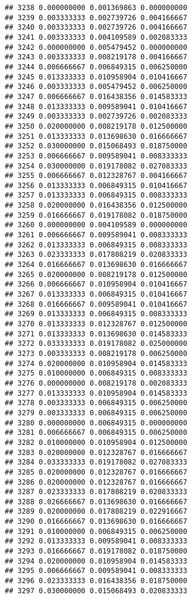 \documentclass[
]{article}
\begin{document}
\begin{verbatim}
## 3238 0.000000000 0.001369863 0.000000000
## 3239 0.003333333 0.002739726 0.004166667
## 3240 0.003333333 0.002739726 0.004166667
## 3241 0.003333333 0.004109589 0.002083333
## 3242 0.000000000 0.005479452 0.000000000
## 3243 0.003333333 0.008219178 0.004166667
## 3244 0.006666667 0.006849315 0.006250000
## 3245 0.013333333 0.010958904 0.010416667
## 3246 0.003333333 0.005479452 0.006250000
## 3247 0.006666667 0.016438356 0.014583333
## 3248 0.013333333 0.009589041 0.010416667
## 3249 0.003333333 0.002739726 0.002083333
## 3250 0.020000000 0.008219178 0.012500000
## 3251 0.013333333 0.013698630 0.016666667
## 3252 0.030000000 0.015068493 0.018750000
## 3253 0.006666667 0.009589041 0.008333333
## 3254 0.030000000 0.019178082 0.027083333
## 3255 0.006666667 0.012328767 0.004166667
## 3256 0.013333333 0.006849315 0.010416667
## 3257 0.013333333 0.006849315 0.008333333
## 3258 0.020000000 0.016438356 0.012500000
## 3259 0.016666667 0.019178082 0.018750000
## 3260 0.000000000 0.004109589 0.000000000
## 3261 0.006666667 0.009589041 0.008333333
## 3262 0.013333333 0.006849315 0.008333333
## 3263 0.023333333 0.017808219 0.020833333
## 3264 0.016666667 0.013698630 0.016666667
## 3265 0.020000000 0.008219178 0.012500000
## 3266 0.006666667 0.010958904 0.010416667
## 3267 0.013333333 0.006849315 0.010416667
## 3268 0.016666667 0.009589041 0.010416667
## 3269 0.013333333 0.006849315 0.008333333
## 3270 0.013333333 0.012328767 0.012500000
## 3271 0.013333333 0.013698630 0.014583333
## 3272 0.033333333 0.019178082 0.025000000
## 3273 0.003333333 0.008219178 0.006250000
## 3274 0.020000000 0.010958904 0.014583333
## 3275 0.010000000 0.006849315 0.008333333
## 3276 0.000000000 0.008219178 0.002083333
## 3277 0.013333333 0.010958904 0.014583333
## 3278 0.003333333 0.006849315 0.006250000
## 3279 0.003333333 0.006849315 0.006250000
## 3280 0.000000000 0.006849315 0.000000000
## 3281 0.006666667 0.006849315 0.006250000
## 3282 0.010000000 0.010958904 0.012500000
## 3283 0.020000000 0.012328767 0.016666667
## 3284 0.033333333 0.019178082 0.027083333
## 3285 0.020000000 0.012328767 0.016666667
## 3286 0.020000000 0.012328767 0.016666667
## 3287 0.023333333 0.017808219 0.020833333
## 3288 0.026666667 0.013698630 0.016666667
## 3289 0.020000000 0.017808219 0.022916667
## 3290 0.016666667 0.013698630 0.016666667
## 3291 0.010000000 0.006849315 0.006250000
## 3292 0.013333333 0.009589041 0.008333333
## 3293 0.016666667 0.019178082 0.018750000
## 3294 0.020000000 0.010958904 0.014583333
## 3295 0.006666667 0.009589041 0.008333333
## 3296 0.023333333 0.016438356 0.018750000
## 3297 0.030000000 0.015068493 0.020833333

\end{verbatim}
\end{document}
